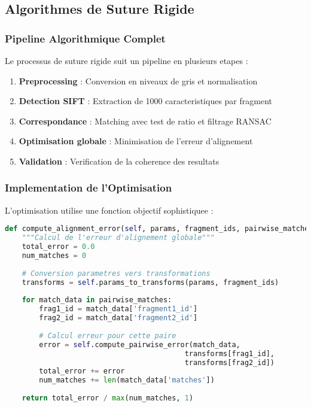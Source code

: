 \documentclass[12pt,a4paper]{article}
\begin{document}
\subsection{Algorithmes de Suture Rigide}

\subsubsection{Pipeline Algorithmique Complet}

Le processus de suture rigide suit un pipeline en plusieurs etapes :

\begin{enumerate}
\item \textbf{Preprocessing} : Conversion en niveaux de gris et normalisation
\item \textbf{Detection SIFT} : Extraction de 1000 caracteristiques par fragment
\item \textbf{Correspondance} : Matching avec test de ratio et filtrage RANSAC
\item \textbf{Optimisation globale} : Minimisation de l'erreur d'alignement
\item \textbf{Validation} : Verification de la coherence des resultats
\end{enumerate}

\subsubsection{Implementation de l'Optimisation}

L'optimisation utilise une fonction objectif sophistiquee :

\begin{lstlisting}[language=Python]
def compute_alignment_error(self, params, fragment_ids, pairwise_matches):
    """Calcul de l'erreur d'alignement globale"""
    total_error = 0.0
    num_matches = 0
    
    # Conversion parametres vers transformations
    transforms = self.params_to_transforms(params, fragment_ids)
    
    for match_data in pairwise_matches:
        frag1_id = match_data['fragment1_id']
        frag2_id = match_data['fragment2_id']
        
        # Calcul erreur pour cette paire
        error = self.compute_pairwise_error(match_data, 
                                          transforms[frag1_id], 
                                          transforms[frag2_id])
        total_error += error
        num_matches += len(match_data['matches'])
    
    return total_error / max(num_matches, 1)
\end{lstlisting}
\end{document}
